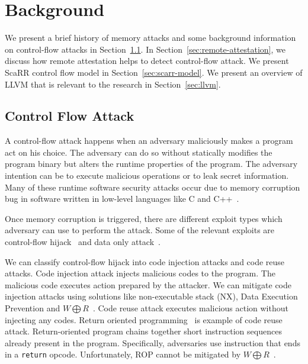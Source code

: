 
\chapter{Background} %

\label{Chapter3} %

We present a brief history of memory attacks and some background information on
control-flow attacks in Section~\ref{sec:control-flow-attack}. In
Section~\ref{sec:remote-attestation}, we discuss how remote attestation helps to
detect control-flow attack. We present ScaRR control flow model in
Section~\ref{sec:scarr-model}. We present an overview of LLVM that is relevant
to the research in Section~\ref{sec:llvm}.

\section{Control Flow Attack}
\label{sec:control-flow-attack}

A control-flow attack happens when an adversary maliciously makes a program act
on his choice. The adversary can do so without statically modifies the program
binary but alters the runtime properties of the program. The adversary intention
can be to execute malicious operations or to leak secret information. Many of
these runtime software security attacks occur due to memory corruption bug
in software written in low-level languages like C and
C++~\cite{szekeresSoKEternalWar2013}.

Once memory corruption is triggered, there are different exploit types which
adversary can use to perform the attack. Some of the relevant exploits are
control-flow hijack~\cite{shachamGeometryInnocentFlesh2007,
schusterCounterfeitObjectorientedProgramming2015}  and data only
attack~\cite{chenNonControlDataAttacksAre2005,
carliniControlFlowBendingEffectiveness2015}. 

We can classify control-flow hijack into code injection attacks and code reuse
attacks. Code injection attack injects malicious codes to the program. The
malicious code executes action prepared by the attacker. We can mitigate code
injection attacks using solutions like non-executable stack (NX), Data Execution
Prevention and \( W \bigoplus R \)~\cite{vanderveenMemoryErrorsPresent2012}.
Code reuse attack executes malicious action without injecting any codes. Return
oriented programming~\cite{roemerReturnorientedProgrammingSystems2012} is
example of code reuse attack. Return-oriented program chains together short
instruction sequences already present in the program. Specifically, adversaries
use instruction that ends in a \texttt{return} opcode. Unfortunately, ROP cannot
be mitigated by \( W \bigoplus R
\)~\cite{roemerReturnorientedProgrammingSystems2012}.

